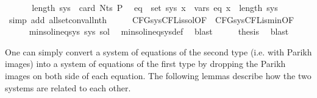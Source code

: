 \begin{isabellebody}
\ \ \isamarkupfalse%
\ \isamarkupfalse%
\ {\isacharasterisk}{\kern0pt}\ {\isacartoucheopen}length\ sys\ {\isacharequal}{\kern0pt}\ card\ {\isacharparenleft}{\kern0pt}Nts\ P{\isacharparenright}{\kern0pt}{\isacartoucheclose}\ \isamarkupfalse%
\ {\isachardoublequoteopen}{\isasymforall}eq\ {\isasymin}\ set\ sys{\isachardot}{\kern0pt}\ {\isasymforall}x\ {\isasymin}\ vars\ eq{\isachardot}{\kern0pt}\ x\ {\isacharless}{\kern0pt}\ length\ sys{\isachardoublequoteclose}\isanewline
\ \ \ \ \isamarkupfalse%
\ {\isacharparenleft}{\kern0pt}simp\ add{\isacharcolon}{\kern0pt}\ all{\isacharunderscore}{\kern0pt}set{\isacharunderscore}{\kern0pt}conv{\isacharunderscore}{\kern0pt}all{\isacharunderscore}{\kern0pt}nth{\isacharparenright}{\kern0pt}\isanewline
\ \ \isamarkupfalse%
\ \isamarkupfalse%
\ CFG{\isacharunderscore}{\kern0pt}sys{\isacharunderscore}{\kern0pt}CFL{\isacharunderscore}{\kern0pt}is{\isacharunderscore}{\kern0pt}sol{\isacharbrackleft}{\kern0pt}OF\ {\isacharasterisk}{\kern0pt}{\isacharbrackright}{\kern0pt}\ CFG{\isacharunderscore}{\kern0pt}sys{\isacharunderscore}{\kern0pt}CFL{\isacharunderscore}{\kern0pt}is{\isacharunderscore}{\kern0pt}min{\isacharbrackleft}{\kern0pt}OF\ {\isacharasterisk}{\kern0pt}{\isacharbrackright}{\kern0pt}\isanewline
\ \ \ \ \isamarkupfalse%
\ {\isachardoublequoteopen}min{\isacharunderscore}{\kern0pt}sol{\isacharunderscore}{\kern0pt}ineq{\isacharunderscore}{\kern0pt}sys\ sys\ sol{\isachardoublequoteclose}\ \isamarkupfalse%
\ min{\isacharunderscore}{\kern0pt}sol{\isacharunderscore}{\kern0pt}ineq{\isacharunderscore}{\kern0pt}sys{\isacharunderscore}{\kern0pt}def\ \isamarkupfalse%
\ blast\isanewline
\ \ \isamarkupfalse%
\ \isamarkupfalse%
\ {\isacharquery}{\kern0pt}thesis\ \isamarkupfalse%
\ blast\isanewline
{}\isamarkupfalse%
%
\endisatagproof
{\isafoldproof}%
%
\isadelimproof
\isanewline
%
\endisadelimproof
\isanewline
{}\isamarkupfalse%
%
\isadelimdocument
%
\endisadelimdocument
%
\isatagdocument
%
\isamarkuptrue%
%
\endisatagdocument
{\isafolddocument}%
%
\isadelimdocument
%
\endisadelimdocument
%
\begin{isamarkuptext}%
One can simply convert a system  of equations of the second type (i.e. with Parikh
images) into a system of equations of the first type by dropping the Parikh images on both side of
each equation. The following lemmas describe how the two systems are related to each other.


\end{isamarkuptext}
\end{isabellebody}

